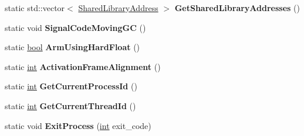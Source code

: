 \begin{DoxyCompactItemize}
static std\+::vector$<$ \mbox{\hyperlink{structv8_1_1base_1_1OS_1_1SharedLibraryAddress}{Shared\+Library\+Address}} $>$ {\bfseries Get\+Shared\+Library\+Addresses} ()
\item 
\mbox{\label{classv8_1_1base_1_1OS_a13338b78af444988376b9ea52903b1c4}} 
static void {\bfseries Signal\+Code\+Moving\+GC} ()
\item 
\mbox{\label{classv8_1_1base_1_1OS_a155958d2b20ee8b323dbc13cb496b981}} 
static \mbox{\hyperlink{classbool}{bool}} {\bfseries Arm\+Using\+Hard\+Float} ()
\item 
\mbox{\label{classv8_1_1base_1_1OS_ab5546854ab1604735a7ff8112651266a}} 
static \mbox{\hyperlink{classint}{int}} {\bfseries Activation\+Frame\+Alignment} ()
\item 
\mbox{\label{classv8_1_1base_1_1OS_a885bdc89bb37ed241b7e312597ad831a}} 
static \mbox{\hyperlink{classint}{int}} {\bfseries Get\+Current\+Process\+Id} ()
\item 
\mbox{\label{classv8_1_1base_1_1OS_ab21ab688f2e6bcbeb2a40246967ec96f}} 
static \mbox{\hyperlink{classint}{int}} {\bfseries Get\+Current\+Thread\+Id} ()
\item 
\mbox{\label{classv8_1_1base_1_1OS_a287990fe7c0e39359181673f0da8a8cc}} 
static void {\bfseries Exit\+Process} (\mbox{\hyperlink{classint}{int}} exit\+\_\+code)
\end{DoxyCompactItemize}
